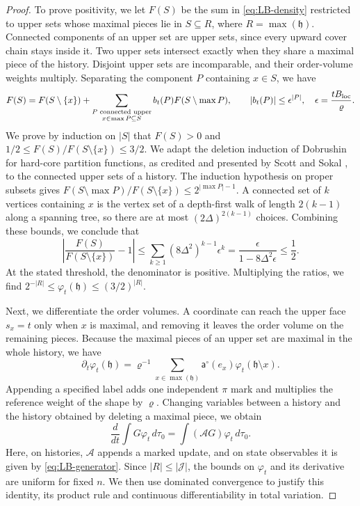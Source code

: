 \begin{proof}
To prove positivity, we let $F(S)$ be the sum in \eqref{eq:LB-density}
restricted to upper sets whose maximal pieces lie in $S\subseteq R$,
where $R=\max(\mathfrak h)$. Connected components of an upper
set are upper sets, since every upward cover chain stays inside it. Two
upper sets intersect exactly when they share a maximal piece of the
history. Disjoint upper sets are incomparable, and their order-volume
weights multiply. Separating the component $P$ containing $x\in S$, we
have
\[
 F(S)=F(S\setminus\{x\})+
 \sum_{\substack{P\text{ connected upper}\\x\in\max P\subseteq S}}
 b_t(P)F(S\setminus\max P),\qquad
 |b_t(P)|\le\epsilon^{|P|},\quad
 \epsilon=\frac{tB_{\rm loc}}\varrho.
\]
We prove by induction on $|S|$ that $F(S)>0$ and
$1/2\le F(S)/F(S\setminus\{x\})\le3/2$. We adapt the deletion induction
of Dobrushin \cite{Dobrushin1996} for hard-core partition functions, as
credited and presented by Scott and Sokal \cite[Section~5.1, Theorem~5.1]{ScottSokal2005},
to the connected upper sets of a history.
The induction hypothesis on proper subsets gives
$F(S\setminus\max P)/F(S\setminus\{x\})\le2^{|\max P|-1}$. A connected set of $k$ vertices containing $x$ is
the vertex set of a depth-first walk of length $2(k-1)$ along a spanning
tree, so there are at most $(2\Delta)^{2(k-1)}$ choices. Combining these
bounds, we conclude that
\[
 \left|\frac{F(S)}{F(S\setminus\{x\})}-1\right|
 \le\sum_{k\ge1}(8\Delta^2)^{k-1}\epsilon^k
 =\frac\epsilon{1-8\Delta^2\epsilon}\le\frac12.
\]
At the stated threshold, the denominator is positive. Multiplying the
ratios, we find
$2^{-|R|}\le\varphi_t(\mathfrak h)\le(3/2)^{|R|}$.

Next, we differentiate the order volumes. A coordinate can reach the
upper face $s_x=t$ only when $x$ is maximal, and removing it leaves the
order volume on the remaining pieces. Because the maximal pieces of an
upper set are maximal in the whole history, we have
\[
 \partial_t\varphi_t(\mathfrak h)=\varrho^{-1}
 \sum_{x\in\max(\mathfrak h)}\mathsf a^\circ(e_x)
                                  \varphi_t(\mathfrak h\setminus x).
\]
Appending a specified label adds one independent $\pi$ mark and
multiplies the reference weight of the shape by $\varrho$. Changing
variables between a history and the history obtained by deleting a
maximal piece, we obtain
\[
 \frac d{dt}\int G\varphi_t\,d\tau_0
 =\int(\mathcal AG)\varphi_t\,d\tau_0.
\]
Here, on histories, $\mathcal A$ appends a marked update, and on state
observables it is given by \eqref{eq:LB-generator}. Since
$|R|\le|\mathcal J|$, the bounds on $\varphi_t$ and its derivative are
uniform for fixed $n$. We then use dominated convergence to justify this
identity, its product rule and continuous differentiability in total
variation.


\end{proof}
